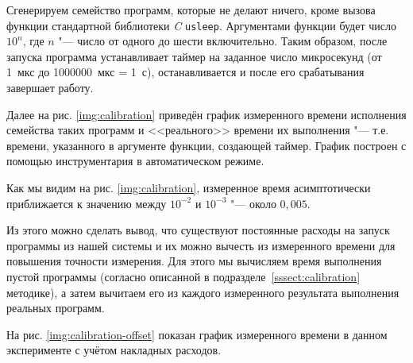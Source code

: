 Сгенерируем семейство программ, которые не делают ничего, кроме вызова функции стандартной библиотеки \textit{C} \texttt{usleep}. Аргументами функции будет число $10^n$, где $n$ "--- число от одного до шести включительно. Таким образом, после запуска программа устанавливает таймер на заданное число микросекунд (от 1~мкс до 1000000~мкс = 1~с), останавливается и после его срабатывания завершает работу.

Далее на рис. \ref{img:calibration} приведён график измеренного времени исполнения семейства таких программ и <<реального>> времени их выполнения "--- т.е. времени, указанного в аргументе функции, создающей таймер. График построен с помощью инструментария в автоматическом режиме.

\begin{figure}[tbp]
\end{figure}

Как мы видим на рис. \ref{img:calibration}, измеренное время асимптотически приближается к значению между $10^{-2}$ и $10^{-3}$ "--- около $0,005$.

Из этого можно сделать вывод, что существуют постоянные расходы на запуск программы из нашей системы и их можно вычесть из измеренного времени для повышения точности измерения. Для этого мы вычисляем время выполнения пустой программы (согласно описанной в подразделе~\ref{sssect:calibration} методике), а затем вычитаем его из каждого измеренного результата выполнения реальных программ.

На рис. \ref{img:calibration-offset} показан график измеренного времени в данном эксперименте с учётом накладных расходов.

\begin{figure}[tbp]
\end{figure}

